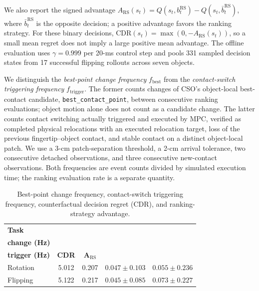 We also report the signed advantage $A_{\mathrm{RS}}(s_t)=Q(s_t,b_t^{\mathrm{RS}})-Q(s_t,\bar b_t^{\mathrm{RS}})$, where $\bar b_t^{\mathrm{RS}}$ is the opposite decision; a positive advantage favors the ranking strategy. For these binary decisions, $\mathrm{CDR}(s_t)=\max(0,-A_{\mathrm{RS}}(s_t))$, so a small mean regret does not imply a large positive mean advantage. The offline evaluation uses $\gamma=0.999$ per 20-ms control step and pools 331 sampled decision states from 17 successful flipping rollouts across seven objects.

We distinguish the \emph{best-point change frequency} $f_{\mathrm{best}}$ from the \emph{contact-switch triggering frequency} $f_{\mathrm{trigger}}$. The former counts changes of CSO's object-local best-contact candidate, \texttt{best\_contact\_point}, between consecutive ranking evaluations; object motion alone does not count as a candidate change. The latter counts contact switching actually triggered and executed by MPC, verified as completed physical relocations with an executed relocation target, loss of the previous fingertip--object contact, and stable contact on a distinct object-local patch. We use a 3-cm patch-separation threshold, a 2-cm arrival tolerance, two consecutive detached observations, and three consecutive new-contact observations. Both frequencies are event counts divided by simulated execution time; the ranking evaluation rate is a separate quantity.

\begin{table}[t]
\centering
\caption{Best-point change frequency, contact-switch triggering frequency, counterfactual decision regret (CDR), and ranking-strategy advantage.}
\label{tab:ranking_frequency_cdr}
\footnotesize
\setlength{\tabcolsep}{2pt}
\begin{tabular*}{\columnwidth}{@{\extracolsep{\fill}} lcccc}
\toprule
\textbf{Task} & \shortstack{\textbf{Best-point}\\\textbf{change (Hz)}} & \shortstack{\textbf{Contact-switch}\\\textbf{trigger (Hz)}} & \textbf{CDR} & $\boldsymbol{A_{\mathrm{RS}}}$ \\
\midrule
Rotation & 5.012 & 0.207 & $0.047 \pm 0.103$ & $0.055 \pm 0.236$ \\
Flipping & 5.122 & 0.217 & $0.045 \pm 0.085$ & $0.073 \pm 0.227$ \\
\bottomrule
\end{tabular*}
\end{table}

